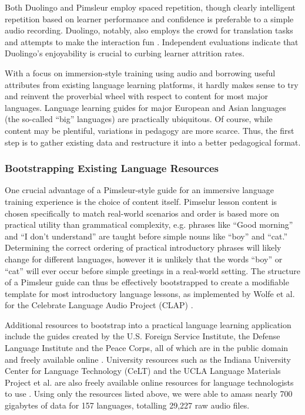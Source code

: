 Both Duolingo and Pimsleur employ spaced repetition, though clearly intelligent repetition based on learner performance and confidence is preferable to a simple audio recording. Duolingo, notably, also employs the crowd for translation tasks and attempts to make the interaction fun \cite{vesselinov2012duolingo} \cite{garcia2013learning}. Independent evaluations indicate that Duolingo's enjoyability is crucial to curbing learner attrition rates. 

With a focus on immersion-style training using audio and borrowing useful attributes from existing language learning platforms, it hardly makes sense to try and reinvent the proverbial wheel with respect to content for most major languages. Language learning guides for major European and Asian languages (the so-called ``big'' languages) are practically ubiquitous. Of course, while content  may be plentiful, variations in pedagogy are more scarce. Thus, the first step is to gather existing data and restructure it into a better pedagogical format. 


\subsubsection{Bootstrapping Existing Language Resources}

One crucial advantage of a Pimsleur-style guide for an immersive language training experience is the choice of content itself. Pimselur lesson content is chosen specifically to match real-world scenarios and order is based more on practical utility than grammatical complexity, e.g. phrases like ``Good morning'' and ``I don't understand'' are taught before simple nouns like ``boy'' and ``cat.'' Determining the correct ordering of practical introductory phrases will likely change for different languages, however it is unlikely that the words ``boy'' or ``cat'' will ever occur before simple greetings in a real-world setting. The structure of a Pimsleur guide can thus be effectively bootstrapped to create a modifiable template for most introductory language lessons, as implemented by Wolfe et al. for the Celebrate Language Audio Project (CLAP) \cite{wolfeclap}. 

Additional resources to bootstrap into a practical language learning application include the guides created by the U.S. Foreign Service Institute, the Defense Language Institute and the Peace Corps, all of which are in the public domain and freely available online \cite{peacecorps} \cite{fsi} \cite{livelingua}. University resources such as the Indiana University Center for Language Technology (CeLT) and the UCLA Language Materials Project et al. are also freely available online resources for language technologists to use \cite{ucla} \cite{celt}. Using only the resources listed above, we were able to amass nearly 700 gigabytes of data for 157 languages, totalling 29,227 raw audio files.

